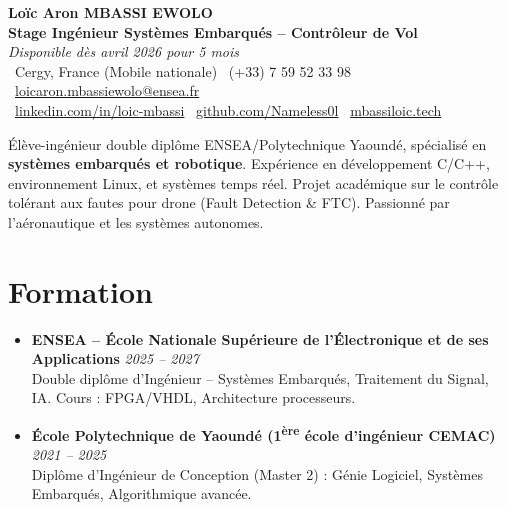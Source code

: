 \documentclass[a4paper,11pt]{article}
\begin{document}
\begin{center}
    {\Large \textbf{Loïc Aron MBASSI EWOLO}} \\ \vspace{4pt}
    \textbf{\large Stage Ingénieur Systèmes Embarqués -- Contrôleur de Vol} \\
    \textit{\small Disponible dès avril 2026 pour 5 mois} \\ \vspace{4pt}
    \small
    \faMapMarker\ Cergy, France (Mobile nationale) \quad
    \faPhone\ (+33) 7 59 52 33 98 \quad
    {\color{primary}\faEnvelope\ \href{mailto:loicaron.mbassiewolo@ensea.fr}{loicaron.mbassiewolo@ensea.fr}} \\ \vspace{2pt}
    {\color{primary}\faLinkedin\ \href{https://www.linkedin.com/in/loic-mbassi/}{linkedin.com/in/loic-mbassi}} \quad
    {\color{primary}\faGithub\ \href{https://github.com/Nameless0l}{github.com/Nameless0l}} \quad
    {\color{primary}\faGlobe\ \href{https://mbassiloic.tech}{mbassiloic.tech}}
\end{center}

\vspace{-6pt}

\noindent\small{Élève-ingénieur double diplôme ENSEA/Polytechnique Yaoundé, spécialisé en \textbf{systèmes embarqués et robotique}. Expérience en développement C/C++, environnement Linux, et systèmes temps réel. Projet académique sur le contrôle tolérant aux fautes pour drone (Fault Detection \& FTC). Passionné par l'aéronautique et les systèmes autonomes.}

\section{Formation}
\begin{itemize}[leftmargin=*, label=\tiny$\bullet$, nosep]
    \item \textbf{ENSEA -- École Nationale Supérieure de l'Électronique et de ses Applications} \hfill \textit{2025 -- 2027} \\
    \small{Double diplôme d'Ingénieur -- Systèmes Embarqués, Traitement du Signal, IA. Cours : FPGA/VHDL, Architecture processeurs.}
    \item \textbf{École Polytechnique de Yaoundé (1\textsuperscript{ère} école d'ingénieur CEMAC)} \hfill \textit{2021 -- 2025} \\
    \small{Diplôme d'Ingénieur de Conception (Master 2) : Génie Logiciel, Systèmes Embarqués, Algorithmique avancée.}
\end{itemize}
\end{document}
